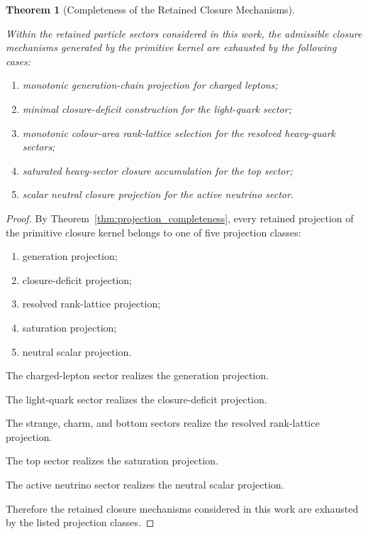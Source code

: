 \documentclass[11pt]{article}
\newtheorem{theorem}{Theorem}[section]
\theoremstyle{definition}
\theoremstyle{remark}
\begin{document}

\begin{theorem}[Completeness of the Retained Closure Mechanisms]
\label{thm:closure_mechanism_completeness}

Within the retained particle sectors considered in this work,
the admissible closure mechanisms generated by the primitive
kernel are exhausted by the following cases:

\begin{enumerate}
\item monotonic generation-chain projection for charged leptons;
\item minimal closure-deficit construction for the light-quark
sector;
\item monotonic colour-area rank-lattice selection for the
resolved heavy-quark sectors;
\item saturated heavy-sector closure accumulation for the top
sector;
\item scalar neutral closure projection for the active neutrino
sector.
\end{enumerate}

\end{theorem}

\begin{proof}

By Theorem~\ref{thm:projection_completeness}, every retained
projection of the primitive closure kernel belongs to one of
five projection classes:

\begin{enumerate}
\item generation projection;
\item closure-deficit projection;
\item resolved rank-lattice projection;
\item saturation projection;
\item neutral scalar projection.
\end{enumerate}

The charged-lepton sector realizes the generation projection.

The light-quark sector realizes the closure-deficit projection.

The strange, charm, and bottom sectors realize the resolved
rank-lattice projection.

The top sector realizes the saturation projection.

The active neutrino sector realizes the neutral scalar
projection.

Therefore the retained closure mechanisms considered in this
work are exhausted by the listed projection classes.

\end{proof}
\end{document}
